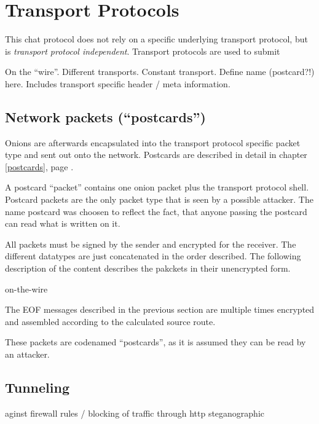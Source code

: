 \section{Transport Protocols}
This chat protocol does not rely on a specific underlying transport protocol,
but is \textit{transport protocol independent}. Transport protocols are used
to submit 


On the "`wire"'. Different transports. Constant transport.
Define name (postcard?!) here. Includes transport specific
header / meta information.

\subsection{Network packets ("`postcards"')}
\label{eofpostcard}
Onions are afterwards encapsulated into the transport protocol specific
packet type and sent out onto the network.
Postcards are described in detail in chapter \ref{postcards}, page \pageref{postcards}.

A postcard "`packet"' contains one onion packet plus the transport protocol
shell.  Postcard packets are the only packet type that is seen by a possible
attacker.  The name postcard was choosen to reflect the fact, that anyone
passing the postcard can read what is written on it.

All packets must be signed by the sender and encrypted for the receiver.
The different datatypes are just concatenated in the order described.
The following description of the content describes the pakckets
in their unencrypted form.

on-the-wire


The EOF messages described in the previous section are multiple times
encrypted and assembled according to the calculated source route.

These packets are codenamed "`postcards"', as it is assumed they can be read
by an attacker.
\subsection{Tunneling}
\label{tunneling}
aginst firewall rules / blocking of traffic
through http
steganographic

